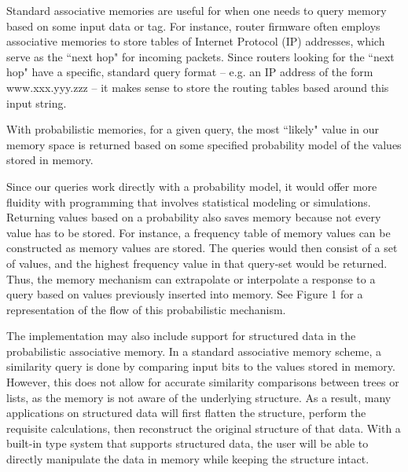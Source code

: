 \documentclass{sig-alternate}
\begin{document}
Standard associative memories are useful for when one needs to query memory based 
on some input data or tag. For instance, router firmware often employs associative 
memories to store tables of Internet Protocol (IP) addresses, which serve as the ``next hop" for incoming 
packets. Since routers looking for the ``next hop" have a specific, standard query 
format -- e.g. an IP address of the form www.xxx.yyy.zzz -- it makes sense to store the 
routing tables based around this input string.


With probabilistic memories, for a given query, the most ``likely" value in our memory space
is returned based on some specified probability model of the values stored in memory.


Since our queries work directly with a probability model, it would offer more fluidity
with programming that involves statistical modeling or simulations. Returning values
based on a probability also saves memory because not every value has to be stored. 
For instance, a frequency table of memory values can be constructed as memory values are stored.
The queries would then consist of a set of values, and the highest frequency value in that query-set would be returned.
Thus, the memory mechanism can extrapolate or interpolate a response to a query based on values 
previously inserted into memory. See Figure 1 for a representation of the flow of 
this probabilistic mechanism.

The implementation may also include support for structured data in the probabilistic associative memory.
In a standard associative memory scheme, a similarity query is done by comparing input bits
to the values stored in memory. However, this does not allow for accurate similarity comparisons
between trees or lists, as the memory is not aware of the underlying structure. As a result,
many applications on structured data will first flatten the structure, perform the requisite 
calculations, then reconstruct the original structure of that data. With a built-in type system
that supports structured data, the user will be able to directly manipulate the data in memory 
while keeping the structure intact.
\end{document}
